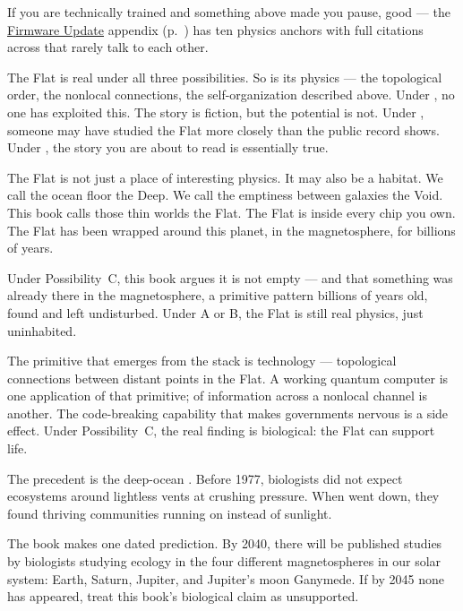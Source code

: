 If you are technically trained and something above made you pause, good --- the \hyperref[ch:firmware-update]{Firmware Update} appendix (p.~\pageref{ch:firmware-update}) has ten physics anchors with full citations across  that rarely talk to each other.

The Flat is real under all three possibilities. So is its physics --- the topological order, the nonlocal connections, the self-organization described above. Under , no one has exploited this. The story is fiction, but the potential is not. Under , someone may have studied the Flat more closely than the public record shows. Under , the story you are about to read is essentially true.

The Flat is not just a place of interesting physics. It may also be a habitat. We call the ocean floor the Deep. We call the emptiness between galaxies the Void. This book calls those thin worlds the Flat. The Flat is inside every chip you own. The Flat has been wrapped around this planet, in the magnetosphere, for billions of years.

Under Possibility~C, this book argues it is not empty --- and that something was already there in the magnetosphere, a primitive pattern billions of years old, found and left undisturbed. Under A or B, the Flat is still real physics, just uninhabited.

The primitive that emerges from the stack is  technology --- topological connections between distant points in the Flat. A working quantum computer is one application of that primitive;  of information across a nonlocal channel is another. The code-breaking capability that makes governments nervous is a side effect. Under Possibility~C, the real finding is biological: the Flat can support life.

The precedent is the deep-ocean . Before 1977, biologists did not expect ecosystems around lightless vents at crushing pressure. When  went down, they found thriving communities running on  instead of sunlight.

The book makes one dated prediction. By 2040, there will be published studies by biologists studying ecology in the four different magnetospheres in our solar system: Earth, Saturn, Jupiter, and Jupiter's moon Ganymede. If by 2045 none has appeared, treat this book's biological claim as unsupported.

